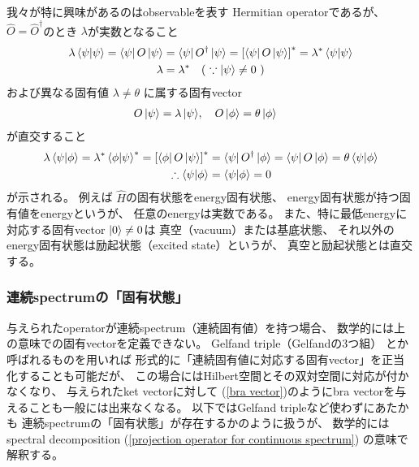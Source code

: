 我々が特に興味があるのはobservableを表す
Hermitian operatorであるが、
$\hat{O} = \hat{O}^\dagger$のとき
$\lambda$が実数となること
\begin{align}
    \lambda \braket{\psi | \psi}
    =
    \bra{\psi} \hat{O} \ket{\psi}
    &= \bra{\psi} \hat{O}^\dagger \ket{\psi}
    = \left[ \bra{\psi} \hat{O} \ket{\psi}\right]^*
    = \lambda^* \braket{\psi | \psi}
\notag\\
    \lambda &= \lambda^*
    \quad
    (\ 
        \because
        \ket{\psi} \neq 0
    \ 
    )
\end{align}
および異なる固有値
$\lambda \neq \theta$
に属する固有vector
\begin{align}
    O \ket{\psi} = \lambda \ket{\psi}
&,\quad
    O \ket{\phi} = \theta \ket{\phi}
\end{align}
が直交すること
\begin{align}
    \lambda
    \braket{\psi|\phi}
    =
    \lambda^*
    \braket{\phi|\psi}^*
    =
    \left[
        \bra{\phi} O \ket{\psi}
    \right]^*
    &= \bra{\psi} O^\dagger \ket{\phi}
    = \bra{\psi} O \ket{\phi}
    = \theta \braket{\psi|\phi}
\notag\\\therefore
    \braket{\psi|\phi}
    &=\braket{\psi|\phi}
    =0
\label{physically distinct states}
\end{align}
が示される。
例えば
$\hat{H}$の固有状態をenergy固有状態、
energy固有状態が持つ固有値をenergyというが、
任意のenergyは実数である。
また、特に最低energyに対応する固有vector
$\ket{0} \neq 0$は
真空（vacuum）または基底状態、
それ以外のenergy固有状態は励起状態（excited state）というが、
真空と励起状態とは直交する。

\subsubsection{連続spectrumの「固有状態」}

与えられたoperatorが連続spectrum（連続固有値）を持つ場合、
数学的には上の意味での固有vectorを定義できない。
Gelfand triple（Gelfandの$3$つ組）
とか呼ばれるものを用いれば
形式的に「連続固有値に対応する固有vector」を正当化することも可能だが、
この場合にはHilbert空間とその双対空間に対応が付かなくなり、
与えられたket vectorに対して
(\ref{bra vector})のようにbra vectorを与えることも一般には出来なくなる。
以下ではGelfand tripleなど使わずにあたかも
連続spectrumの「固有状態」が存在するかのように扱うが、
数学的にはspectral decomposition
(\ref{projection operator for continuous spectrum})
の意味で解釈する。

